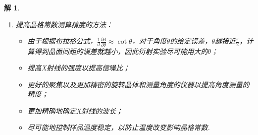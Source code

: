 \documentclass[UTF8,10pt,a4paper]{article}
\theoremstyle{Problem}
\theoremstyle{Solution}
\newtheorem*{sol}{解}
\begin{document}
\begin{sol}
\begin{enumerate}
\begin{itemize}
\begin{align}
                a=d\sqrt{h^2+k^2+l^2}=0.112\text{nm}\times\sqrt{2^2+2^2+2^2}=0.389\text{nm}.
            \end{align}
            最近的两个原子间的距离为
            \begin{align}
                \frac{a}{\sqrt{2}}a=0.275\text{nm}.
            \end{align}
            \item[$\triangleright$] 若每个格点只含$1$个原子，则钯的密度为
            \begin{align}
                \rho=\frac{4\times\frac{106.4\times 10^{-3}}{6.02\times 10^{23}}\text{kg}}{(0.389\times 10^{-9}m)^3}=12010\text{kg m}^{-3}.
            \end{align}
            这一结果与已知的钯的密度$12023\text{kg m}^{-3}$符合得很好.
        \end{itemize}
        \item[(e)] 提高晶格常数测算精度的方法：
        \begin{itemize}
            \item 由于根据布拉格公式，$\frac{1}{d}\frac{\partial d}{\partial\theta}\approx\cot\theta$，对于角度$\theta$的给定误差，$\theta$越接近$\frac{\pi}{2}$，计算得到晶面间距的误差就越小，因此衍射实验尽可能用大的$\theta$；
            \item 提高X射线的强度以提高信噪比；
            \item 更好的聚焦以及更加精密的旋转晶体和测量角度的仪器以提高角度测量的精度；
            \item 更加精确地确定X射线的波长；
            \item 尽可能地控制样品温度稳定，以防止温度改变影响晶格常数.
        \end{itemize}
    \end{enumerate}
\end{sol}
\end{document}
